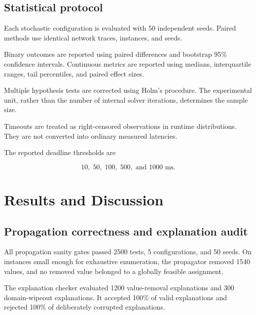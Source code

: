 \documentclass[pdflatex,sn-mathphys-num,iicol,oneside]{sn-jnl}
\begin{document}
\subsection{Statistical protocol}

Each stochastic configuration is evaluated with
50 independent seeds.
Paired methods use identical network traces, instances, and seeds.

Binary outcomes are reported using paired differences and bootstrap
95\% confidence intervals. Continuous metrics are reported using
medians, interquartile ranges, tail percentiles, and paired effect
sizes.

Multiple hypothesis tests are corrected using Holm's procedure.
The experimental unit, rather than the number of internal solver
iterations, determines the sample size.

Timeouts are treated as right-censored observations in runtime
distributions. They are not converted into ordinary measured
latencies.

The reported deadline thresholds are

\begin{equation}
10,\;50,\;100,\;500,\;\text{and }1000\text{ ms}.
\end{equation}

\section{Results and Discussion}
\label{sec:results}

\subsection{Propagation correctness and explanation audit}

All propagation sanity gates passed
2500 tests, 5 configurations, and 50 seeds. On instances small
enough for exhaustive enumeration, the propagator removed
1540 values, and no removed value belonged to a globally
feasible assignment.

The explanation checker evaluated
1200 value-removal explanations and
300 domain-wipeout explanations. It accepted
100\% of valid explanations and rejected
100\% of deliberately corrupted explanations.
\end{document}
